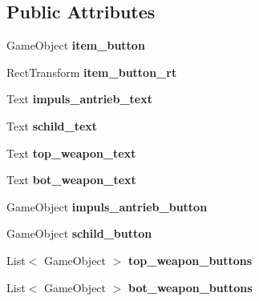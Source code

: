 \subsection*{Public Attributes}
\begin{DoxyCompactItemize}
\item 
\mbox{\label{class_raumschiff_inventory_a13419ddb20af9509fef81affd54b1d86}} 
Game\+Object {\bfseries item\+\_\+button}
\item 
\mbox{\label{class_raumschiff_inventory_a164ab7c879ee868d2953509bbbbde5f5}} 
Rect\+Transform {\bfseries item\+\_\+button\+\_\+rt}
\item 
\mbox{\label{class_raumschiff_inventory_ad35b02c4f9e4e24fcf4ec60603aff170}} 
Text {\bfseries impuls\+\_\+antrieb\+\_\+text}
\item 
\mbox{\label{class_raumschiff_inventory_ad582bf87bd94f8876f348432918cd839}} 
Text {\bfseries schild\+\_\+text}
\item 
\mbox{\label{class_raumschiff_inventory_ab71281ffbe8f3b64f94ddde919ea85ac}} 
Text {\bfseries top\+\_\+weapon\+\_\+text}
\item 
\mbox{\label{class_raumschiff_inventory_a8832281e3648f14fb237a8226efcc61d}} 
Text {\bfseries bot\+\_\+weapon\+\_\+text}
\item 
\mbox{\label{class_raumschiff_inventory_a9e4927b2e083517c9c3db1db58c27870}} 
Game\+Object {\bfseries impuls\+\_\+antrieb\+\_\+button}
\item 
\mbox{\label{class_raumschiff_inventory_a6519212a6c5ee2492e2718f761e487bc}} 
Game\+Object {\bfseries schild\+\_\+button}
\item 
\mbox{\label{class_raumschiff_inventory_a3fbadb8a028bbeaf05271807b320c636}} 
List$<$ Game\+Object $>$ {\bfseries top\+\_\+weapon\+\_\+buttons}
\item 
\mbox{\label{class_raumschiff_inventory_ae3fc542f4d537cef97571a7b9b0eed35}} 
List$<$ Game\+Object $>$ {\bfseries bot\+\_\+weapon\+\_\+buttons}
\end{DoxyCompactItemize}
